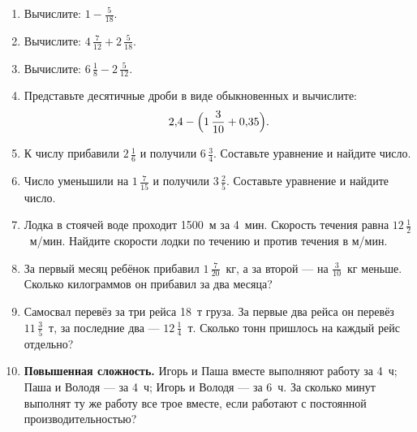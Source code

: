 \documentclass[a4paper,12pt]{article}
\newcommand{\mixed}[3]{#1\,\frac{#2}{#3}}
\begin{document}
\begin{enumerate}
\item Вычислите: \(\displaystyle 1-\frac5{18}\).
\item Вычислите: \(\displaystyle \mixed{4}{7}{12}+\mixed{2}{5}{18}\).
\item Вычислите: \(\displaystyle \mixed{6}{1}{8}-\mixed{2}{5}{12}\).
\item Представьте десятичные дроби в виде обыкновенных и вычислите:
\[2{,}4-\Bigl(\mixed{1}{3}{10}+0{,}35\Bigr).\]
\item К числу прибавили \(\mixed{2}{1}{6}\) и получили \(\mixed{6}{3}{4}\). Составьте уравнение и найдите число.
\item Число уменьшили на \(\mixed{1}{7}{15}\) и получили \(\mixed{3}{2}{5}\). Составьте уравнение и найдите число.
\item Лодка в стоячей воде проходит 1500~м за 4~мин. Скорость течения равна \(\mixed{12}{1}{2}\)~м/мин. Найдите скорости лодки по течению и против течения в м/мин.
\item За первый месяц ребёнок прибавил \(\mixed{1}{7}{20}\)~кг, а за второй --- на \(\frac3{10}\)~кг меньше. Сколько килограммов он прибавил за два месяца?
\item Самосвал перевёз за три рейса 18~т груза. За первые два рейса он перевёз \(\mixed{11}{3}{5}\)~т, за последние два --- \(\mixed{12}{1}{4}\)~т. Сколько тонн пришлось на каждый рейс отдельно?
\item \textbf{Повышенная сложность.} Игорь и Паша вместе выполняют работу за 4~ч; Паша и Володя --- за 4~ч; Игорь и Володя --- за 6~ч. За сколько минут выполнят ту же работу все трое вместе, если работают с постоянной производительностью?
\end{enumerate}
\end{document}
